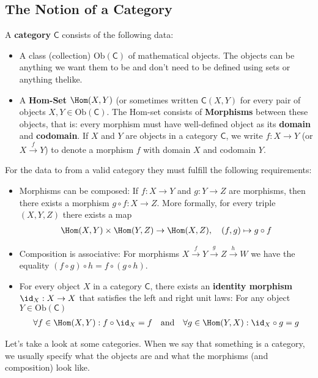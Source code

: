 \subsection{The Notion of a Category}
A \textbf{category} $\textsf{C}$ consists of the following data: 
\begin{itemize}
  \item A class (collection) $\text{Ob}(\textsf{C})$ of mathematical objects. The objects can be anything we want them to be and don't need to be defined using sets or anything thelike.
  \item A \textbf{Hom-Set} $\Hom(X,Y)$ (or sometimes written $\textsf{C}(X,Y)$ for every pair of objects $X,Y \in \text{Ob}(\textsf{C})$. 
    The Hom-set consists of \textbf{Morphisms} between these objects, that is: every morphism must have well-defined object as its \textbf{domain} and \textbf{codomain}.
    If $X$ and $Y$ are objects in a category $\textsf{C}$, we write $f: X \to Y$ (or $X \stackrel{f}{\to}Y$) to denote a morphism $f$ with domain $X$ and codomain $Y$.
\end{itemize}
For the data to from a valid category they must fulfill the following requirements:
\begin{itemize}
  \item Morphisms can be composed: If $f:X \to Y$ and $g: Y \to Z$ are morphisms, then there exists a morphism $g \circ f: X \to Z$.
    More formally, for every triple $(X,Y,Z)$ there exists a map
    \begin{align*}
      \Hom(X,Y) \times \Hom(Y,Z) \to \Hom(X,Z), \quad (f,g) \mapsto g \circ f
    \end{align*}
  \item Composition is associative: For morphisms $X \stackrel{f}{\to } Y \stackrel{g}{\to} Z \stackrel{h}{\to} W$ we have the equality $(f \circ g) \circ h = f \circ (g \circ h)$.
  \item For every object $X$ in a category $\textsf{C}$, there exists an \textbf{identity morphism} $\id_X: X \to  X$ that satisfies the left and right unit laws: For any object $Y \in \text{Ob}(\textsf{C})$
    \begin{align*}
      \forall f \in \Hom(X,Y): f \circ \id_X = f \quad \text{and} \quad \forall g \in \Hom(Y,X): \id_X \circ g = g
    \end{align*}
\end{itemize}

Let's take a look at some categories. 
When we say that something is a category, we usually specify what the objects are and what the morphisms (and composition) look like.

